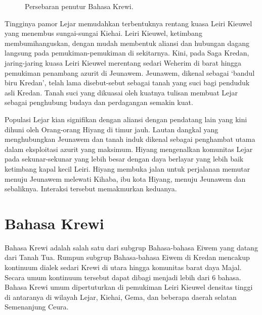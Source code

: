 \documentclass[12pt,oneside]{book}
\begin{document}
\begin{figure}[]
	\centering
	\caption{Persebaran penutur Bahasa Krewi.}
	\label{fig:1}
\end{figure}

Tingginya pamor Lejar memudahkan terbentuknya rentang kuasa Leiri Kieuwel yang menembus sungai-sungai Kiehai. Leiri Kieuwel, ketimbang membumihanguskan, dengan mudah membentuk aliansi dan hubungan dagang langsung pada pemukiman-pemukiman di sekitarnya. Kini, pada Saga Kredan, jaring-jaring kuasa Leiri Kieuwel merentang sedari Weherim di barat hingga pemukiman penambang azurit di Jeunawem. Jeunawem, dikenal sebagai `bandul biru Kredan', telah lama disebut-sebut sebagai tanah yang suci bagi penduduk asli Kredan. Tanah suci yang dikuasai oleh kuatnya tulisan membuat Lejar sebagai penghubung budaya dan perdagangan semakin kuat.

Populasi Lejar kian signifikan dengan aliansi dengan pendatang lain yang kini dihuni oleh Orang-orang Hiyang di timur jauh. Lautan dangkal yang menghubungkan Jeunawem dan tanah induk dikenal sebagai penghambat utama dalam eksploitasi azurit yang maksimum. Hiyang mengenalkan komunitas Lejar pada sekunar-sekunar yang lebih besar dengan daya berlayar yang lebih baik ketimbang kapal kecil Leiri. Hiyang membuka jalan untuk perjalanan memutar menuju Jeunawem melewati Kihaba, ibu kota Hiyang, menuju Jeunawem dan sebaliknya. Interaksi tersebut memakmurkan keduanya. 


\section{Bahasa Krewi}
Bahasa Krewi adalah salah satu dari subgrup Bahasa-bahasa Eiwem yang datang dari Tanah Tua. Rumpun subgrup Bahasa-bahasa Eiwem di Kredan mencakup kontinuum dialek sedari Krewi di utara hingga komunitas barat daya Majal. Secara umum kontinuum tersebut dapat dibagi menjadi lebih dari 6 bahasa. Bahasa Krewi umum dipertuturkan di pemukiman Leiri Kieuwel densitas tinggi di antaranya di wilayah Lejar, Kiehai, Gema, dan beberapa daerah selatan Semenanjung Ceura.
\end{document}
